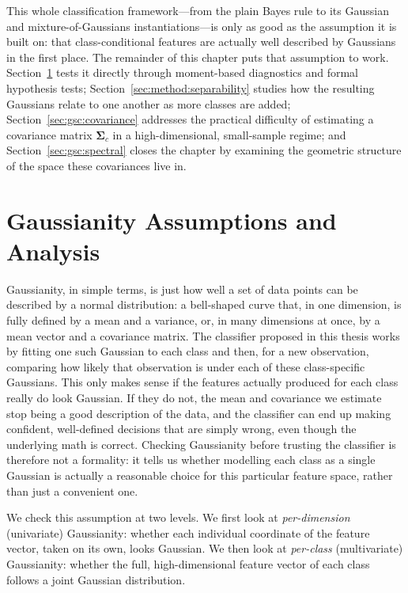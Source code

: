 This whole classification framework---from the plain Bayes rule to its Gaussian and mixture-of-Gaussians instantiations---is only as good as the assumption it is built on: that class-conditional features are actually well described by Gaussians in the first place. The remainder of this chapter puts that assumption to work. Section~\ref{sec:method:gaussianity_main} tests it directly through moment-based diagnostics and formal hypothesis tests; Section~\ref{sec:method:separability} studies how the resulting Gaussians relate to one another as more classes are added; Section~\ref{sec:gsc:covariance} addresses the practical difficulty of estimating a covariance matrix $\boldsymbol{\Sigma}_c$ in a high-dimensional, small-sample regime; and Section~\ref{sec:gsc:spectral} closes the chapter by examining the geometric structure of the space these covariances live in.

\section{Gaussianity Assumptions and Analysis}
\label{sec:method:gaussianity_main}

Gaussianity, in simple terms, is just how well a set of data points can be described by a normal distribution: a bell-shaped curve that, in one dimension, is fully defined by a mean and a variance, or, in many dimensions at once, by a mean vector and a covariance matrix. The classifier proposed in this thesis works by fitting one such Gaussian to each class and then, for a new observation, comparing how likely that observation is under each of these class-specific Gaussians. This only makes sense if the features actually produced for each class really do look Gaussian. If they do not, the mean and covariance we estimate stop being a good description of the data, and the classifier can end up making confident, well-defined decisions that are simply wrong, even though the underlying math is correct. Checking Gaussianity before trusting the classifier is therefore not a formality: it tells us whether modelling each class as a single Gaussian is actually a reasonable choice for this particular feature space, rather than just a convenient one.

We check this assumption at two levels. We first look at \emph{per-dimension} (univariate) Gaussianity: whether each individual coordinate of the feature vector, taken on its own, looks Gaussian. We then look at \emph{per-class} (multivariate) Gaussianity: whether the full, high-dimensional feature vector of each class follows a joint Gaussian distribution.

